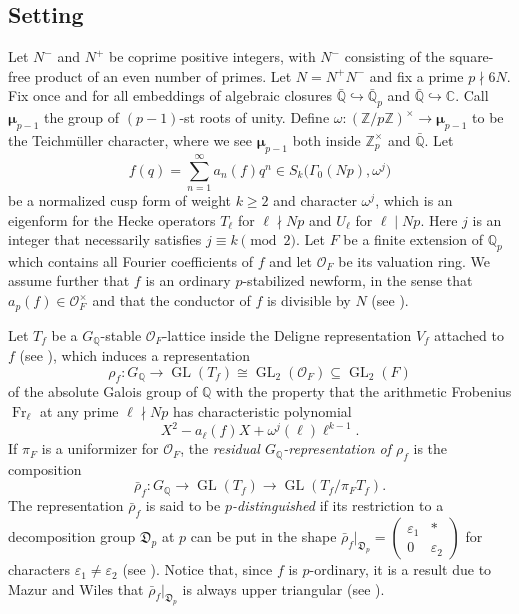 \documentclass[12pt,reqno]{amsart}
\theoremstyle{definition}
\theoremstyle{remark}
\newcommand{\numberset}{\mathbb}
\newcommand{\C}{\numberset{C}}
\newcommand{\Q}{\numberset{Q}}
\newcommand{\Z}{\numberset{Z}}
\newcommand{\OF}{\mathcal{O}_F}
\DeclareMathOperator{\GL}{GL}
\DeclareMathOperator{\Fr}{Fr}
\newcommand{\e}{\varepsilon}
\begin{document}
\subsection{Setting} Let $N^-$ and $N^+$ be coprime positive integers, with $N^-$ consisting of the square-free product of an even number of primes. Let $N=N^+N^-$ and fix a prime $p\nmid 6N$. Fix once and for all embeddings of algebraic closures $\bar{\Q}\hookrightarrow \bar{\Q}_p$ and $\bar{\Q}\hookrightarrow\C$. Call $\boldsymbol{\mu}_{p-1}$ the group of $(p-1)$-st roots of unity. Define $\omega\colon (\Z/p\Z)^\times\to \boldsymbol{\mu}_{p-1}$ to be the Teichm\"uller character, where we see $\boldsymbol{\mu}_{p-1}$ both inside $\Z_p^\times$ and $\bar{\Q}$. Let
	\begin{equation*}
	f(q)=\sum_{n=1}^\infty a_n(f)q^n\in S_k\big(\Gamma_0(Np),\omega^j\big)
	\end{equation*}
	be a normalized cusp form of weight $k\ge 2$ and character $\omega^j$, which is an eigenform for the Hecke operators $T_\ell$ for $\ell\nmid Np$ and $U_\ell$ for $\ell\mid Np$. Here $j$ is an integer that necessarily satisfies $j\equiv k\pmod 2$. Let $F$ be a finite extension of $\Q_p$ which contains all Fourier coefficients of $f$ and let $\OF$ be its valuation ring. We assume further that $f$ is an ordinary $p$-stabilized newform, in the sense that $a_p(f)\in\OF^\times$ and that the conductor of $f$ is divisible by $N$ (see \cite[Section 2.4]{Vigni22:shafarevich-tate-groups}). 

Let $T_f$ be a $G_\Q$-stable $\OF$-lattice inside the Deligne representation $V_f$ attached to $f$ (see \cite{Deligne:formes-modulaires}), which induces a representation
\begin{equation*}
    \rho_{f}\colon G_\Q\longrightarrow \GL(T_{f})\cong\GL_2(\OF)\subseteq\GL_2(F)
\end{equation*}
of the absolute Galois group of $\Q$ with the property that the arithmetic Frobenius $\Fr_\ell$ at any prime $\ell\nmid Np$ has characteristic polynomial
 \begin{equation*}
     X^2-a_\ell(f) X+\omega^j(\ell)\ell^{k-1}.
 \end{equation*}
If $\pi_F$ is a uniformizer for $\OF$, the \emph{residual $G_\Q$-representation of $\rho_f$} is the composition
 \begin{equation*}
            \bar{\rho}_f: G_\Q\longrightarrow \GL(T_f)\longrightarrow \GL(T_f/\pi_F T_f).
\end{equation*}
The representation $\bar{\rho}_f$ is said to be \emph{$p$-distinguished} if its restriction to a decomposition group $\mathfrak{D}_p$ at $p$ can be put in the shape $\bar{\rho}_f|_{\mathfrak{D}_p}=\left(\begin{smallmatrix}
        \e_1 &*\\ 0&\e_2
    \end{smallmatrix}\right)$ for characters $\e_1\ne \e_2$ (see \cite[Definition 4]{Ghate05:ordinary-forms}). Notice that, since $f$ is $p$-ordinary, it is a result due to Mazur and Wiles that $\bar{\rho}_f|_{\mathfrak{D}_p}$ is always upper triangular (see \cite[§1]{Ghate05:ordinary-forms}).
\end{document}
